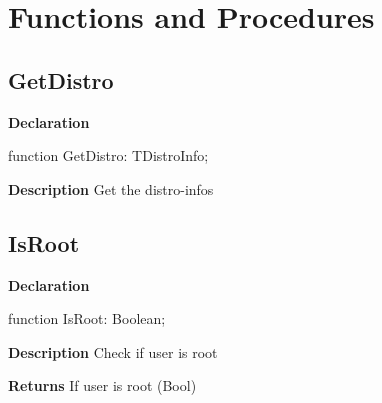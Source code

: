\documentclass{report}
\newif\ifpdf
\begin{document}
\section{Functions and Procedures}
\ifpdf
\subsection*{\large{\textbf{GetDistro}}\normalsize\hspace{1ex}\hrulefill}
\else
\subsection*{GetDistro}
\fi
\label{distri-GetDistro}
\begin{list}{}{
\setlength{\itemindent}{0cm}
\setlength{\listparindent}{0cm}
\setlength{\leftmargin}{\evensidemargin}
\addtolength{\leftmargin}{\tmplength}
\settowidth{\labelsep}{X}
\addtolength{\leftmargin}{\labelsep}
\setlength{\labelwidth}{\tmplength}
}
\item[\textbf{Declaration}\hfill]
\ifpdf
\begin{flushleft}
\fi
\begin{ttfamily}
function GetDistro: TDistroInfo;\end{ttfamily}

\ifpdf
\end{flushleft}
\fi

\par
\item[\textbf{Description}]
Get the distro{-}infos

\end{list}
\ifpdf
\subsection*{\large{\textbf{IsRoot}}\normalsize\hspace{1ex}\hrulefill}
\else
\subsection*{IsRoot}
\fi
\label{distri-IsRoot}
\begin{list}{}{
\setlength{\itemindent}{0cm}
\setlength{\listparindent}{0cm}
\setlength{\leftmargin}{\evensidemargin}
\addtolength{\leftmargin}{\tmplength}
\settowidth{\labelsep}{X}
\addtolength{\leftmargin}{\labelsep}
\setlength{\labelwidth}{\tmplength}
}
\item[\textbf{Declaration}\hfill]
\ifpdf
\begin{flushleft}
\fi
\begin{ttfamily}
function IsRoot: Boolean;\end{ttfamily}

\ifpdf
\end{flushleft}
\fi

\par
\item[\textbf{Description}]
Check if user is root \par
\item[\textbf{Returns}]If user is root (Bool)


\end{list}
\ifpdf
\end{document}
